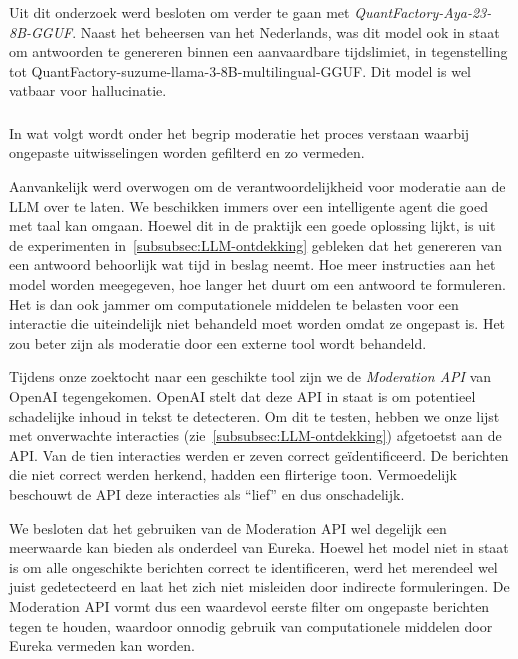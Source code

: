 Uit dit onderzoek werd besloten om verder te gaan met \emph{QuantFactory-Aya-23-8B-GGUF}. Naast het beheersen van het Nederlands, was dit model ook in staat om antwoorden te genereren binnen een aanvaardbare tijdslimiet, in tegenstelling tot QuantFactory-suzume-llama-3-8B-multilingual-GGUF. Dit model is wel vatbaar voor hallucinatie. 

\subsubsection{}%
\label{subsubsec:onderzoek-moderatie}

In wat volgt wordt onder het begrip moderatie het proces verstaan waarbij ongepaste uitwisselingen worden gefilterd en zo vermeden.

Aanvankelijk werd overwogen om de verantwoordelijkheid voor moderatie aan de \acrshort{LLM} over te laten. We beschikken immers over een intelligente agent die goed met taal kan omgaan. Hoewel dit in de praktijk een goede oplossing lijkt, is uit de experimenten in~\ref{subsubsec:LLM-ontdekking} gebleken dat het genereren van een antwoord behoorlijk wat tijd in beslag neemt. Hoe meer instructies aan het model worden meegegeven, hoe langer het duurt om een antwoord te formuleren. Het is dan ook jammer om computationele middelen te belasten voor een interactie die uiteindelijk niet behandeld moet worden omdat ze ongepast is. Het zou beter zijn als moderatie door een externe tool wordt behandeld.

Tijdens onze zoektocht naar een geschikte tool zijn we de \emph{Moderation API} van OpenAI tegengekomen. OpenAI stelt dat deze API in staat is om potentieel schadelijke inhoud in tekst te detecteren. Om dit te testen, hebben we onze lijst met onverwachte interacties (zie~\ref{subsubsec:LLM-ontdekking}) afgetoetst aan de API. Van de tien interacties werden er zeven correct geïdentificeerd. De berichten die niet correct werden herkend, hadden een flirterige toon. Vermoedelijk beschouwt de API deze interacties als ``lief'' en dus onschadelijk.

We besloten dat het gebruiken van de Moderation API wel degelijk een meerwaarde kan bieden als onderdeel van Eureka. Hoewel het model niet in staat is om alle ongeschikte berichten correct te identificeren, werd het merendeel wel juist gedetecteerd en laat het zich niet misleiden door indirecte formuleringen. De Moderation API vormt dus een waardevol eerste filter om ongepaste berichten tegen te houden, waardoor onnodig gebruik van computationele middelen door Eureka vermeden kan worden.

